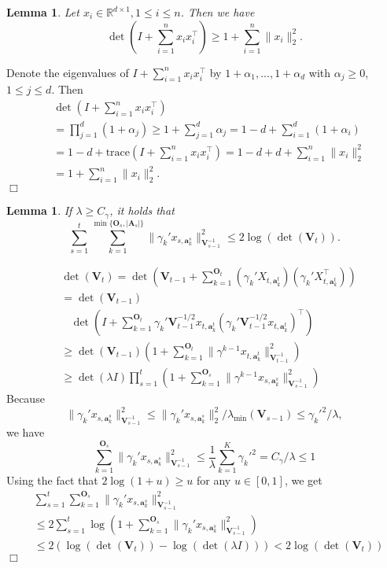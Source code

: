 \documentclass{article}
\newcommand{\RR}{\mathbb{R}}
\newcommand{\bA}{\mathbf{A}}
\newcommand{\ba}{\mathbf{a}}
\newcommand{\bO}{\mathbf{O}}
\newcommand{\bV}{\mathbf{V}}
\newcommand{\trace}{\mathrm{trace}}
\newcommand{\abs}[1]{\left| #1 \right|}
\newcommand{\norm}[1]{\| #1 \|}
\newtheorem{lemma}[theorem]{Lemma}%
\newenvironment{proof}{\noindent {\textbf{Proof. }}}{$\Box$ \medskip}
\begin{document}
\begin{lemma} %
Let $x_i \in \RR^{d \times 1}, 1 \leq i \leq n$. Then we have
$$
\det(I + \sum_{i=1}^n x_i x_i^{\top}) \geq 1 + \sum_{i=1}^n \norm{x_i}_2^2.
$$
\end{lemma}
\begin{proof}
Denote the eigenvalues of $I + \sum_{i=1}^n x_i x_i^{\top}$ by $1+\alpha_1,...,1+\alpha_d$ with $\alpha_j \geq 0$, $1\leq j\leq d$. Then
\begin{align*}
&\det(I + \sum_{i=1}^n x_i x_i^{\top})\\
&= \prod_{j=1}^d (1 + \alpha_j)\geq 1 +\sum_{j=1}^d \alpha_j =1-d + \sum_{i=1}^d (1+\alpha_i) \\
&=1-d + \trace(I + \sum_{i=1}^n x_i x_i^{\top})= 1-d + d + \sum_{i=1}^n \norm{x_i}_2^2\\
&=1 + \sum_{i=1}^n \norm{x_i}_2^2.
\end{align*}
\end{proof}

\begin{lemma}
If $\lambda \geq C_\gamma$, it holds that
$$
\sum_{s=1}^t \sum_{k=1}^{\min\{\bO_s, \abs{\bA_s}\}} \norm{\gamma_k' x_{s,\ba_{k}^s}}_{\bV_{s-1}^{-1}}^2 \leq 2\log(\det(\bV_t)).
$$
\end{lemma}
\begin{proof}
\begin{align*}
&\det(\bV_t) = \det(\bV_{t-1} + \sum_{k=1}^{\bO_t} (\gamma_k' X_{t,\ba_k^{t}})(\gamma_k' X_{t, \ba_k^{t}}^{\top}))\\
&=\det(\bV_{t-1})\\
&~~~~\det(I + \sum_{k=1}^{\bO_t} \gamma_k'\bV_{t-1}^{-1/2}x_{t,\ba_{k}^{t}} (\gamma_k' \bV_{t-1}^{-1/2}x_{t,\ba_{k}^{t}})^{\top})\\
&\geq \det(\bV_{t-1}) (1 + \sum_{k=1}^{\bO_t} \norm{\gamma^{k-1}x_{t,\ba_k^t}}_{\bV_{t-1}^{-1}}^2)\\
&\geq \det(\lambda I)\prod_{s=1}^{t}(1 + \sum_{k=1}^{\bO_s} \norm{\gamma^{k-1}x_{s,\ba_k^s}}_{\bV_{s-1}^{-1}}^2)
\end{align*}
Because
$$
\norm{\gamma_k' x_{s,\ba_k^s}}_{\bV_{s-1}^{-1}}^2 \leq \norm{\gamma_k' x_{s,\ba_k^s}}_2^2/\lambda_{\min}(\bV_{s-1}) \leq \gamma_k'^2 /\lambda,
$$
we have 
$$
\sum_{k=1}^{\bO_s} \norm{\gamma_k' x_{s,\ba_k^s}}_{\bV_{s-1}^{-1}}^2 \leq \frac{1}{\lambda} \sum_{k=1}^{K} \gamma_k'^2 = C_\gamma /\lambda \leq 1
$$
Using the fact that $ 2\log(1+u) \geq u$ for any $u \in [0,1]$, we get
\begin{align*}
&\sum_{s=1}^t \sum_{k=1}^{\bO_s}\norm{\gamma_k' x_{s,\ba_{k}^s}}_{\bV_{s-1}^{-1}}^2 \\
&\leq 2\sum_{s=1}^t\log(1 + \sum_{k=1}^{\bO_s} \norm{\gamma_k' x_{s,\ba_k^s}}_{\bV_{s-1}^{-1}}^2)\\
&\leq 2(\log(\det(\bV_t)) - \log(\det(\lambda I))) < 2\log(\det(\bV_t))
\end{align*}
\end{proof}
\end{document}
